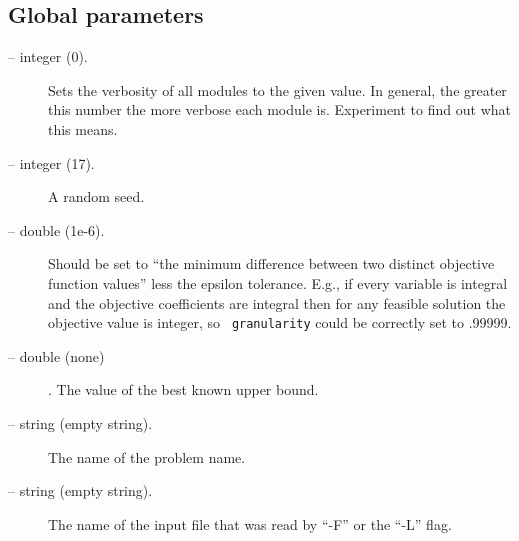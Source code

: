 \subsection{Global parameters}
\begin{description}
\item[ -- integer (0).] 
Sets the verbosity of all modules to the given value. In general,
the greater this number the more verbose each module is. Experiment
to find out what this means.

\item[ -- integer (17).] 
A random seed.

\item[ -- double (1e-6).]
Should be set to ``the minimum difference between two distinct
objective function values'' less the epsilon tolerance. E.g., if every
variable is integral and the objective coefficients are integral then
for any feasible solution the objective value is integer, so {\tt
granularity} could be correctly set to .99999.

\item[ -- double (none)]. 
The value of the best known upper bound.

\item[ -- string (empty string).]
The name of the problem name.

\item[ -- string (empty string).]
The name of the input file that was read by ``-F'' or the ``-L'' flag.

\end{description}

